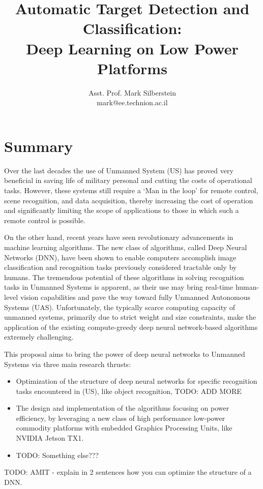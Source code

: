 \documentclass{article} %
\title{Automatic Target Detection and Classification: \\
  Deep Learning on Low Power Platforms}
\author{
  Asst. Prof. Mark Silberstein \\
  mark@ee.technion.ac.il\\
}
\begin{document}
\maketitle

\section{Summary}

Over the last decades the use of Unmanned System (US) has proved very beneficial in
saving life of military personal and cutting the costs of operational tasks.
However, these systems still require a `Man in the loop' for remote control, scene
recognition, and data acquisition, 
thereby increasing the cost of operation and significantly limiting the scope of 
applications to those in which such a remote control is possible.

On the other hand, recent years have seen revolutionary advancements in machine learning
algorithms. The new class of algorithms, called Deep Neural Networks (DNN), have
been shown to enable 
computers accomplish image classification and recognition tasks previously
considered tractable only by humans. The tremendous potential of these
algorithms in solving recognition tasks in Unmanned Systems is apparent, as 
their use may bring real-time human-level vision capabilities and pave the way
toward fully Unmanned Autonomous Systems (UAS).
Unfortunately, the typically scarce computing capacity of unmanned systems,
primarily due to strict weight and size constraints, make the application of the
existing compute-greedy deep neural network-based algorithms extremely challenging. 

This proposal aims to bring the power of deep neural networks to Unmanned
Systems via three main research thrusts:

\begin{itemize}
	\item Optimization of the structure of deep neural networks for specific
		recognition tasks encountered in (US), like object recognition,
		TODO: ADD MORE 
\item The design and implementation of the algorithms focusing on power
	efficiency, by leveraging a new  class of high
	performance low-power commodity platforms with embedded Graphics
	Processing Units, like  NVIDIA Jetson TX1.
\item  TODO: Something else???
\end{itemize}

TODO: AMIT - explain in 2 sentences how you can optimize the structure of a DNN.
\end{document}
